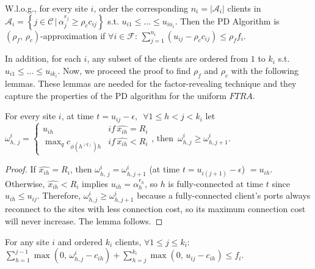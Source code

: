 \documentclass[10pt]{llncs}
\begin{document}
\begin{corollary}
W.l.o.g., for every site $i$, order the corresponding $n_{i}=\left|\mathcal{A}_{i}\right|$
clients in $\mathcal{A}_{i}=\left\{ j\in\mathcal{C}\,|\,\alpha_{j}^{r_{j}}\geq\rho_{c}c_{ij}\right\} $
s.t. $u_{i1}\leq\ldots\leq u_{in_{i}}$. Then the PD Algorithm is
$\left(\rho_{f},\,\rho_{c}\right)$-approximation if $\forall i\in\mathcal{F}:\,\sum_{j=1}^{n_{i}}\left(u_{ij}-\rho_{c}c_{ij}\right)\le\rho_{f}f_{i}$.
\label{cor:s-appro}
\end{corollary}
In addition, for each $i$, any subset of the clients are ordered
from $1$ to $k_{i}$ s.t. $u_{i1}\leq\ldots\leq u_{ik_{i}}$. Now,
we proceed the proof to find $\rho_{f}$ and $\rho_{c}$ with the
following lemmas. These lemmas are needed for the factor-revealing
technique and they capture the properties of the PD algorithm for
the uniform $FTRA$.
\begin{lemma}
For every site $i$, at time $t=u_{ij}-\epsilon,\,$ $\forall1\leq h<j<k_{i}$
let $\omega_{h,\, j}^{i}=\begin{cases}
u_{ih} & if\,\hat{x_{ih}}=R_{i}\\
\max_{q}c_{\phi\left(h^{\left(q\right)}\right)h} & if\,\hat{x_{ih}}<R_{i}
\end{cases}$, then $\,\omega_{h,j}^{i}\geq\omega_{h,j+1}^{i}$.\label{lem:r}\end{lemma}
\begin{proof}
If $\hat{x_{ih}}=R_{i}$, then $\omega_{h,\, j}^{i}=\omega_{h,j+1}^{i}$
(at time $t=u_{i\left(j+1\right)}-\epsilon$) $=u_{ih}$. Otherwise,
$\hat{x_{ih}}<R_{i}$ implies $u_{ih}=\alpha_{h}^{r_{h}}$, so $h$
is fully-connected at time $t$ since $ $$u_{ih}\leq u_{ij}$. Therefore,
$\omega_{h,j}^{i}\geq\omega_{h,j+1}^{i}$ because a fully-connected
client's ports always reconnect to the sites with less connection
cost, so its maximum connection cost will never increase. The lemma
follows.\end{proof}
\begin{lemma}
For any site $i$ and ordered $k_{i}$ clients, $\forall1\leq j\leq k_{i}:\,$\linebreak{}
$\sum_{h=1}^{j-1}\max\left(0,\,\omega_{h,j}^{i}-c_{ih}\right)+\sum_{h=j}^{k_{i}}\max\left(0,\, u_{ij}-c_{ih}\right)\leq f_{i}$.\label{lem:contri}\end{lemma}
\end{document}
